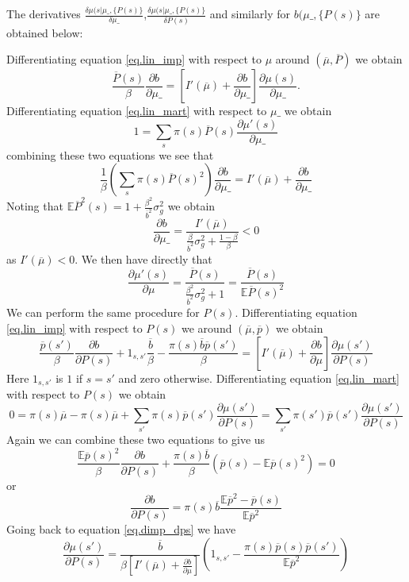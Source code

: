 \documentclass[thmsb,11pt]{article}
\newcommand{\EE}{\mathbb E}
\newcommand{\pbar}{{\overline p}}
\newcommand{\bbar}{{\overline b}}
\newcommand{\mubar}{{\overline \mu}}
\begin{document}
The derivatives $\frac{\delta \mu(s|\mu\_,\{P(s)\}}{\delta \mu\_}$,$\frac{\delta \mu(s|\mu\_,\{P(s)\}}{\delta P(s)}$ and similarly for  $b(\mu\_,\{P(s)\}$ are obtained below:


Differentiating equation \eqref{eq.lin_imp} with respect to $\mu$ around $(\overline \mu,\overline P)$ we obtain
\[
	\frac{\overline{P}(s)}{\beta}\frac{\partial b}{\partial \mu\_} = \left[I'(\mubar)+\frac{\partial b}{\partial \mu\_}\right]\frac{\partial \mu(s)}{\partial \mu\_}.
\]Differentiating equation \eqref{eq.lin_mart} with respect to $\mu\_$ we obtain
\[
	1 = \sum_{s} \pi(s) \overline P(s) \frac{\partial \mu'(s)}{\partial \mu\_}
\]combining these two equations we see that
\[
	\frac1\beta\left(\sum_s\pi(s)\overline P(s)^2\right)\frac{\partial b}{\partial \mu\_} = I'(\mubar) + \frac{\partial b}{\partial \mu\_}
\]Noting that $\EE\overline P^2(s) = 1 + \frac{\beta^2}{\bbar^2}\sigma^2_g$ we obtain
\begin{equation}
	\frac{\partial b}{\partial \mu\_} = \frac{I'(\mubar)}{\frac{\beta}{\bbar^2}\sigma_g^2 +\frac{1-\beta}{\beta}} < 0
\end{equation}as $I'(\mubar) < 0$.  We then have directly that
\begin{equation}
	\frac{\partial \mu'(s)}{\partial \mu} = \frac{\overline P(s)}{\frac{\beta^2}{\overline b^2}\sigma^2_g +1} = \frac{\overline P(s)}{\EE\overline P(s)^2}
\end{equation}  We can perform the same procedure for $P(s)$.  Differentiating equation \eqref{eq.lin_imp} with respect to $P(s)$ we around $(\mubar,\pbar)$ we obtain
\begin{equation}\label{eq.dimp_dps}
\frac{\pbar(s')}{\beta}\frac{\partial b}{\partial P(s)} + 1_{s,s'}\frac{\bbar}{\beta} - \frac{\pi(s)\bbar\pbar(s')}{\beta} = \left[I'(\mubar) + \frac{\partial b}{\partial \mu}\right]\frac{\partial \mu(s')}{\partial P(s)}
\end{equation} Here $1_{s,s'}$ is $1$ if $s = s'$ and zero otherwise.  Differentiating equation \eqref{eq.lin_mart} with respect to $P(s)$ we obtain
\[
	0 = \pi(s)\overline \mu - \pi(s)\overline \mu + \sum_{s'} \pi(s) \pbar(s')\frac{\partial \mu(s')}{\partial P(s)} =  \sum_{s'} \pi(s')\pbar(s')\frac{\partial \mu(s')}{\partial P(s)}
\]  Again we can combine these two equations to give us
\[
	\frac{\EE\pbar(s)^2}{\beta}\frac{\partial b}{\partial P(s)} + \frac{\pi(s)\bbar}{\beta}(\pbar(s)-\EE\pbar(s)^2) = 0
\] or
\begin{equation}
	\frac{\partial b}{\partial P(s)} = \pi(s)\bbar \frac{\EE\pbar^2-\pbar(s)}{\EE\pbar^2}
\end{equation}Going back to equation \eqref{eq.dimp_dps} we have
\begin{equation}
	\frac{\partial \mu(s')}{\partial P(s)} = \frac{\bbar}{\beta\left[I '(\mubar) + \frac{\partial b}{\partial \mu}\right]}\left(1_{s,s'}-\frac{\pi(s)\pbar(s)\pbar(s')}{\EE\pbar^2}\right)
\end{equation}
\end{document}
